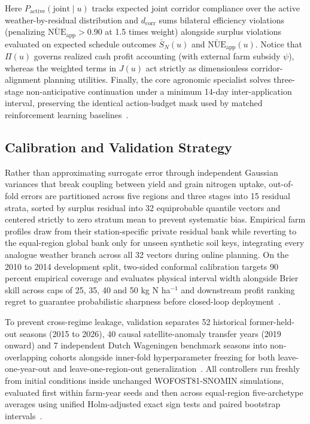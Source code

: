 \documentclass[11pt,a4paper]{article}
\begin{document}
Here $P_{\text{active}}(\text{joint} \mid u)$ tracks expected joint corridor compliance over the active weather-by-residual distribution and $d_{\text{corr}}$ sums bilateral efficiency violations (penalizing $\bar{\text{NUE}}_{\text{app}} > 0.90$ at 1.5 times weight) alongside surplus violations evaluated on expected schedule outcomes $\bar{S}_N(u)$ and $\bar{\text{NUE}}_{\text{app}}(u)$. Notice that $\Pi(u)$ governs realized cash profit accounting (with external farm subsidy $\psi$), whereas the weighted terms in $J(u)$ act strictly as dimensionless corridor-alignment planning utilities. Finally, the core agronomic specialist solves three-stage non-anticipative continuation under a minimum 14-day inter-application interval, preserving the identical action-budget mask used by matched reinforcement learning baselines~\citep{ppo2017,mask2020}.

\subsection{Calibration and Validation Strategy}

Rather than approximating surrogate error through independent Gaussian variances that break coupling between yield and grain nitrogen uptake, out-of-fold errors are partitioned across five regions and three stages into 15 residual strata, sorted by surplus residual into 32 equiprobable quantile vectors and centered strictly to zero stratum mean to prevent systematic bias. Empirical farm profiles draw from their station-specific private residual bank while reverting to the equal-region global bank only for unseen synthetic soil keys, integrating every analogue weather branch across all 32 vectors during online planning. On the 2010 to 2014 development split, two-sided conformal calibration targets 90 percent empirical coverage and evaluates physical interval width alongside Brier skill across caps of 25, 35, 40 and 50 kg N ha$^{-1}$ and downstream profit ranking regret to guarantee probabilistic sharpness before closed-loop deployment~\citep{fisher1981,geurts2006}.

To prevent cross-regime leakage, validation separates 52 historical former-held-out seasons (2015 to 2026), 40 causal satellite-anomaly transfer years (2019 onward) and 7 independent Dutch Wageningen benchmark seasons into non-overlapping cohorts alongside inner-fold hyperparameter freezing for both leave-one-year-out and leave-one-region-out generalization~\citep{roberts2017,cawley2010}. All controllers run freshly from initial conditions inside unchanged WOFOST81-SNOMIN simulations, evaluated first within farm-year seeds and then across equal-region five-archetype averages using unified Holm-adjusted exact sign tests and paired bootstrap intervals~\citep{holm1979,phipson2010}.
\end{document}
